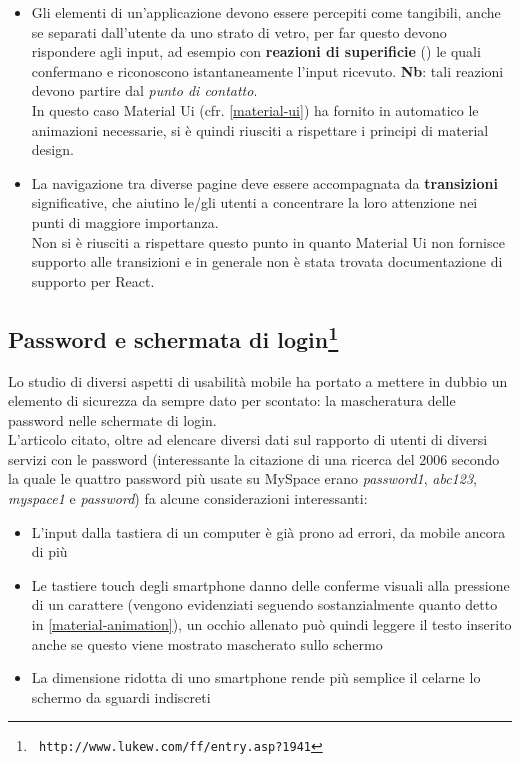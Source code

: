 \begin{itemize}
\item Gli elementi di un'applicazione devono essere percepiti come tangibili, anche
se separati dall'utente da uno strato di vetro, per far questo devono rispondere agli
input, ad esempio con \textbf{reazioni di superificie} (\textit{})
le quali confermano
e riconoscono istantaneamente l'input ricevuto. \textbf{Nb}: tali reazioni devono
partire dal \textit{punto di contatto}. \\
In questo caso Material Ui (cfr. \ref{material-ui}) ha fornito in automatico le animazioni
necessarie, si è quindi riusciti a rispettare i principi di material design.
\item La navigazione tra diverse pagine deve essere accompagnata da
\textbf{transizioni} significative, che aiutino le/gli utenti a concentrare la loro
attenzione nei punti di maggiore importanza. \\
Non si è riusciti a rispettare questo punto in quanto Material Ui non fornisce supporto
alle transizioni e in generale non è stata trovata documentazione di supporto per
React.
\end{itemize}

\subsection[Password e schermata di login]{Password e schermata di login\footnote{\texttt{ http://www.lukew.com/ff/entry.asp?1941}}}\label{password}

Lo studio di diversi aspetti di usabilità mobile ha portato a mettere in dubbio un elemento
di sicurezza da sempre dato per scontato: la mascheratura delle password nelle schermate di
login. \\
L'articolo citato, oltre ad elencare diversi dati sul rapporto di utenti di diversi servizi
con le password (interessante la citazione di una ricerca del 2006 secondo la quale le quattro
password più usate su MySpace erano \textit{password1}, \textit{abc123}, \textit{myspace1} e
\textit{password}) fa alcune considerazioni interessanti:

\begin{itemize}
\item L'input dalla tastiera di un computer è già prono ad errori, da mobile ancora di più
\item Le tastiere touch degli smartphone danno delle conferme visuali alla pressione di un
carattere (vengono evidenziati seguendo sostanzialmente quanto detto in \ref{material-animation}),
un occhio allenato può quindi leggere il testo inserito anche se questo viene mostrato
mascherato sullo schermo
\item La dimensione ridotta di uno smartphone rende più semplice il celarne lo schermo
da sguardi indiscreti
\end{itemize}

